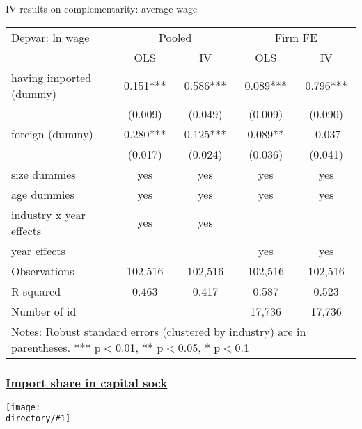 \documentclass[10pt]{beamer}
\newcommand{\directory}{figures}
\newcommand{\longfigure}[2]{\begin{frame}\frametitle{\hyperlink{#1back}{#2}}\hypertarget{#1}{{\begin{center}\texttt{[image: \\directory/\#1]}\end{center}}}\end{frame}}
\begin{document}
\begin{frame}{IV results on complementarity: average wage}
\begin{table}
	\renewcommand{\baselinestretch}{1.2}  \scriptsize \centering
	\begin{tabular}{lcccc}
		\hline \hline
    	Depvar: ln wage & \multicolumn{2}{c}{Pooled} & \multicolumn{2}{c}{Firm FE} \\
		& OLS   & IV    & OLS   & IV \\ \hline
		having imported (dummy) & 0.151*** & 0.586*** & 0.089*** & 0.796*** \\
		& (0.009) & (0.049) & (0.009) & (0.090) \\
		foreign (dummy) & 0.280*** & 0.125*** & 0.089** & -0.037 \\
		& (0.017) & (0.024) & (0.036) & (0.041) \\
		size dummies & yes   & yes   & yes   & yes \\
		age dummies & yes   & yes   & yes   & yes \\
		industry x year effects & yes   & yes   &       &  \\
		year effects &       &       & yes   & yes \\
		Observations & 102,516 & 102,516 & 102,516 & 102,516 \\
		R-squared & 0.463 & 0.417 & 0.587 & 0.523 \\
		Number of id &       &       & 17,736 & 17,736 \\
		\hline \hline
		\multicolumn{5}{l}{%
			\begin{minipage}{8cm}
				\scriptsize Notes: Robust standard errors (clustered by industry) are in parentheses. *** p$<$0.01, ** p$<$0.05, * p$<$0.1%
			\end{minipage}%
		}\\
	\end{tabular}%
	\renewcommand{\baselinestretch}{1.62}\normalsize \setlength{\baselineskip}{0.65\baselineskip}
\end{table}
\end{frame}

\longfigure{hist_impstock}{Import share in capital sock}
\end{document}
